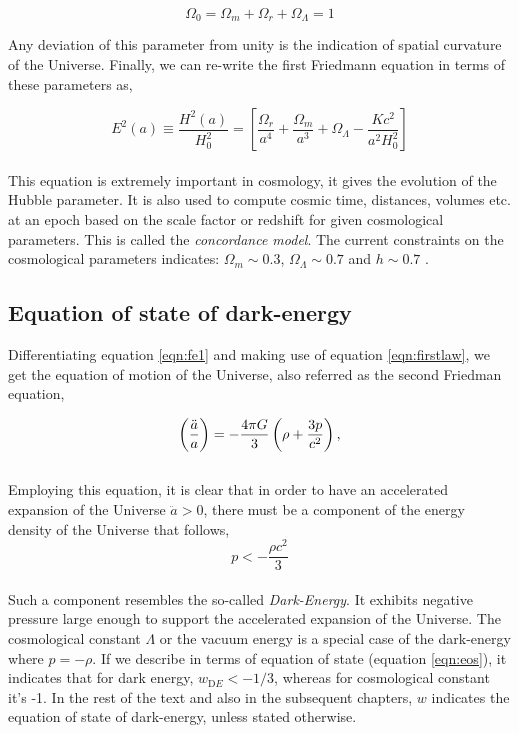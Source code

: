 \documentclass[
  11pt,
  twoside,
  openright,
  titlepage,
  headings=optiontoheadandtoc
]{scrbook}
\begin{document}
\begin{equation}
	\Omega_0 = \Omega_m + \Omega_r + \Omega_{\Lambda} = 1
\end{equation}

Any deviation of this 
parameter from unity is the indication of spatial curvature of the Universe.
Finally, we can re-write the first Friedmann equation in terms of these parameters as,

\begin{equation}
	E^2(a) \equiv \dfrac{H^2(a)}{H_0^2} = \left[\dfrac{\Omega_r}{a^4}
	 + \dfrac{\Omega_m}{a^3} +
	 \Omega_{\Lambda} - \dfrac{Kc^2}{a^2H_0^2}  \right]
	 \label{eqn:hubbleparameter}
\end{equation}
\\
This equation is extremely important in cosmology, it gives the evolution of the 
Hubble parameter. It is also used to compute cosmic time, distances, volumes
etc. at an epoch based on the scale factor or redshift for given cosmological
parameters. This is called the {\em concordance model}. The current constraints on the
cosmological parameters indicates: $\Omega_m \sim 0.3$, $\Omega_{\Lambda} \sim 0.7$
and $h \sim 0.7$ \citep{2015arXiv150201589P}.


\subsection{Equation of state of dark-energy}

Differentiating equation \ref{eqn:fe1} and making use of equation
\ref{eqn:firstlaw}, we get the equation of motion of the Universe,
also referred as the second Friedman equation,

\begin{equation}
\centering
		\left( \dfrac{\ddot{a}}{a} \right) = -\dfrac{4 \pi G}{3} 
			\left( \rho + \dfrac{3p}{c^2} \right),
\label{eqn:fe2}
\end{equation}
\\
Employing this equation, it is clear that in order to have an 
accelerated expansion of the Universe $\ddot{a}>0$,
there must be a component of the energy density of the Universe that follows,
\begin{equation}
	p < -\dfrac{\rho c^2}{3} 
\end{equation}
\\
Such a component resembles the so-called {\it Dark-Energy}. It exhibits 
negative pressure large enough to support the accelerated expansion of the
Universe. The cosmological constant $\Lambda$  or the vacuum energy is a 
special case of the dark-energy where $p=-\rho$. If we describe in terms 
of equation of state (equation \ref{eqn:eos}), it indicates that for 
dark energy, $w_{\mathrm DE}<-1/3$, whereas for cosmological constant it's -1.
In the rest of the text and also in the subsequent chapters, $w$ indicates
the equation of state of dark-energy, unless stated otherwise.
\end{document}
